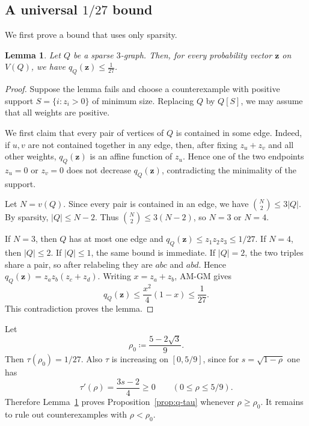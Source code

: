 \documentclass[10pt]{article}
\numberwithin{equation}{section}
\newtheorem{lemma}[theorem]{Lemma}
\theoremstyle{definition}
\theoremstyle{remark}
\begin{document}
\subsection[Universal 1/27 bound]{A universal $1/27$ bound}

We first prove a bound that uses only sparsity.

\begin{lemma}\label{lem:one-over-27}
Let $Q$ be a sparse $3$-graph. Then, for every probability vector $\mathbf{z}$ on $V(Q)$, we have $q_Q(\mathbf{z})\le\frac1{27}$.
\end{lemma}

\begin{proof}
Suppose the lemma fails and choose a counterexample with positive support $S=\{i:z_i>0\}$ of minimum size. Replacing $Q$ by $Q[S]$, we may assume that all weights are positive.

We first claim that every pair of vertices of $Q$ is contained in some edge. Indeed, if $u,v$ are not contained together in any edge, then, after fixing $z_u+z_v$ and all other weights, $q_Q(\mathbf{z})$ is an affine function of $z_u$. Hence one of the two endpoints $z_u=0$ or $z_v=0$ does not decrease $q_Q(\mathbf{z})$, contradicting the minimality of the support.

Let $N=v(Q)$. Since every pair is contained in an edge, we have $\binom N2\le 3|Q|$. By sparsity, $|Q|\le N-2$. Thus $\binom N2\le 3(N-2)$, so $N=3$ or $N=4$.

If $N=3$, then $Q$ has at most one edge and $q_Q(\mathbf{z})\le z_1z_2z_3\le1/27$. If $N=4$, then $|Q|\le2$. If $|Q|\le1$, the same bound is immediate. If $|Q|=2$, the two triples share a pair, so after relabeling they are $abc$ and $abd$. Hence $q_Q(\mathbf{z})=z_az_b(z_c+z_d)$. Writing $x=z_a+z_b$, AM-GM gives
\[
        q_Q(\mathbf{z})\le\frac{x^2}{4}(1-x)\le\frac1{27}.
\]
This contradiction proves the lemma.
\end{proof}

Let
\begin{equation}\label{eq:rho0}
        \rho_0
        \coloneqq \frac{5-2\sqrt3}{9}.
\end{equation}
Then $\tau(\rho_0)=1/27$. Also $\tau$ is increasing on $[0,5/9]$, since for $s=\sqrt{1-\rho}$ one has
\[
        \tau'(\rho)=\frac{3s-2}{4}\ge0
        \qquad (0\le\rho\le5/9).
\]
Therefore Lemma~\ref{lem:one-over-27} proves Proposition~\ref{prop:q-tau} whenever $\rho\ge\rho_0$. It remains to rule out counterexamples with $\rho<\rho_0$.
\end{document}
